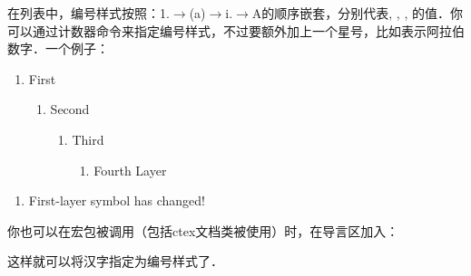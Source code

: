 在列表中，编号样式按照：1.$\rightarrow$(a)$\rightarrow$i.$\rightarrow$A的顺序嵌套，分别代表, , , 的值．你可以通过计数器命令来指定编号样式，不过要额外加上一个星号，比如表示阿拉伯数字．一个例子：
\begin{codeshow}
\begin{enumerate}\item First
  \begin{enumerate}\item Second
     \begin{enumerate}\item Third
       \begin{enumerate}
       \item Fourth Layer
\end{enumerate}\end{enumerate}
\end{enumerate}\end{enumerate}
\renewcommand{\theenumi}
  {\roman{enumi}}
\renewcommand{\labelenumi}
  {(\theenumi)}
\begin{enumerate}
\item First-layer symbol has changed!
\end{enumerate}
\end{codeshow}

你也可以在宏包被调用（包括ctex文档类被使用）时，在导言区加入：
\begin{latex}
\AddEnumerateCounter{\chinese}{\chinese}{}
\end{latex}

这样就可以将汉字指定为编号样式了．

